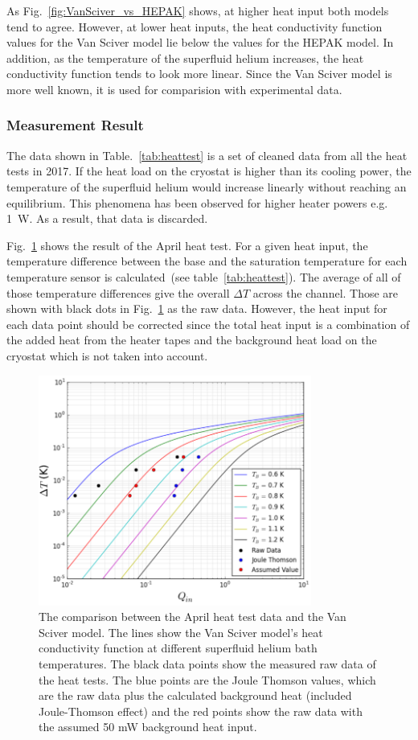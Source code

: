 As Fig.~\ref{fig:VanSciver_vs_HEPAK} shows, at higher heat input both
models tend to agree. However, at lower heat inputs, the heat
conductivity function values for the Van Sciver model lie below the
values for the HEPAK model. In addition, as the temperature of the
superfluid helium increases, the heat conductivity function tends to
look more linear. Since the Van Sciver model is more well known, it is
used for comparision with experimental data.

\subsubsection{Measurement Result}
The data shown in Table.~\ref{tab:heattest} is a set of cleaned data
from all the heat tests in 2017. If the heat load on the cryostat is
higher than its cooling power, the temperature of the superfluid
helium would increase linearly without reaching an equilibrium. This
phenomena has been observed for higher heater powers e.g. 1~W. As a
result, that data is discarded.


Fig.~\ref{fig:April_Data} shows the result of the April heat test.
For a given heat input, the temperature difference between the base
and the saturation temperature for each temperature sensor is
calculated~(see table~\ref{tab:heattest}). The average of all of those
temperature differences give the overall $\Delta T$ across the
channel. Those are shown with black dots in Fig.~\ref{fig:April_Data}
as the raw data. However, the heat input for each data point should be
corrected since the total heat input is a combination of the added
heat from the heater tapes and the background heat load on the
cryostat which is not taken into account.


\begin{figure}[h!]
  \centering \includegraphics[width=0.8\textwidth]{April_Data.png}
  \caption{The comparison between the April heat test data and the Van
    Sciver model. The lines show the Van Sciver model's heat
    conductivity function at different superfluid helium bath
    temperatures. The black data points show the measured raw data of
    the heat tests. The blue points are the Joule Thomson values,
    which are the raw data plus the calculated background heat
    (included Joule-Thomson effect) and the red points show the raw
    data with the assumed 50 mW background heat input. }
\label{fig:April_Data}
\end{figure}


